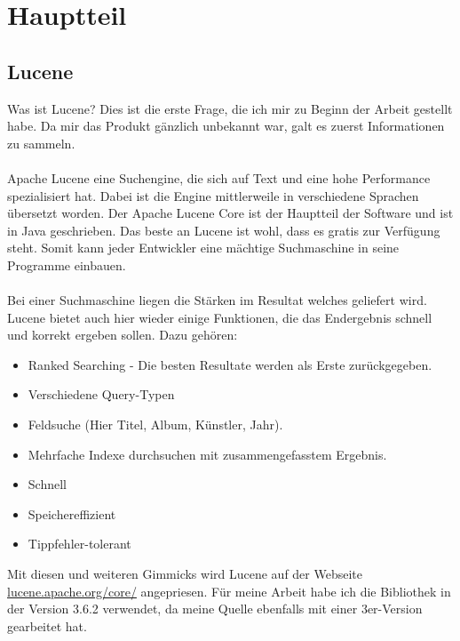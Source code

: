 \documentclass[12pt,a4paper,ngerman]{report}
\begin{document}
\chapter{Hauptteil}
\section*{Lucene}
Was ist Lucene? Dies ist die erste Frage, die ich mir zu Beginn der Arbeit gestellt habe. Da mir das Produkt gänzlich unbekannt war, galt es zuerst Informationen zu sammeln.\\
\\
Apache Lucene eine Suchengine, die sich auf Text und eine hohe Performance spezialisiert hat. Dabei ist die Engine mittlerweile in verschiedene Sprachen übersetzt worden. Der Apache Lucene Core ist der Hauptteil der Software und ist in Java geschrieben. Das beste an Lucene ist wohl, dass es gratis zur Verfügung steht. Somit kann jeder Entwickler eine mächtige Suchmaschine in seine Programme einbauen. \\
\\
Bei einer Suchmaschine liegen die Stärken im Resultat welches geliefert wird. Lucene bietet auch hier wieder einige Funktionen, die das Endergebnis schnell und korrekt ergeben sollen. Dazu gehören:
\begin{itemize}
	\item Ranked Searching - Die besten Resultate werden als Erste zurückgegeben.
	\item Verschiedene Query-Typen
	\item Feldsuche (Hier Titel, Album, Künstler, Jahr).
	\item Mehrfache Indexe durchsuchen mit zusammengefasstem Ergebnis.
	\item Schnell
	\item Speichereffizient
	\item Tippfehler-tolerant
\end{itemize}
Mit diesen und weiteren Gimmicks wird Lucene auf der Webseite \url{lucene.apache.org/core/} angepriesen. Für meine Arbeit habe ich die Bibliothek in der Version 3.6.2 verwendet, da meine Quelle ebenfalls mit einer 3er-Version gearbeitet hat.
\end{document}
